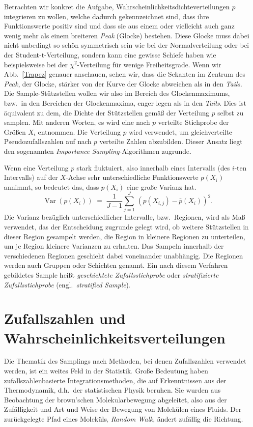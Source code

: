 Betrachten wir konkret die Aufgabe, Wahrscheinlichkeitsdichteverteilungen $p$
integrieren zu wollen, welche dadurch gekennzeichnet sind, dass ihre Funktionswerte
positiv sind und dass sie aus einem
oder vielleicht auch ganz wenig mehr als einem breiteren \textsl{Peak} (Glocke) bestehen.
Diese Glocke muss dabei nicht unbedingt so schön symmetrisch sein wie bei der 
Normalverteilung oder bei der Student-t-Verteilung, sondern kann eine gewisse Schiefe haben
wie beispielsweise bei der $\chi^2$-Verteilung für wenige Freiheitsgrade.
Wenn wir Abb.~\ref{Trapez} genauer anschauen, sehen wir, dass die Sekanten im Zentrum
des \textsl{Peak}, der Glocke, stärker von der Kurve der Glocke abweichen als in den
\textsl{Tails}. Die Sample-Stützstellen wollen wir also im Bereich des Glockenmaximums, bzw.\
in den Bereichen der Glockenmaxima, enger legen als in den \textsl{Tails}. Dies ist äquivalent
zu dem, die Dichte der Stützstellen gemäß der Verteilung $p$ selbst zu samplen.
Mit anderen Worten, es wird eine nach $p$ verteilte Stichprobe der Größen $X_i$
entnommen. Die Verteilung $p$ wird verwendet, um gleichverteilte Pseudozufallszahlen auf nach $p$
verteilte Zahlen abzubilden. 
Dieser Ansatz liegt den sogenannten \textsl{Importance Sampling}-Algorithmen zugrunde.

Wenn eine Verteilung $p$ stark fluktuiert, also innerhalb eines
Intervalls (des $i$-ten Intervalls) auf der $X$-Achse sehr unterschiedliche Funktionswerte $p(X_i)$ annimmt,
so bedeutet das, dass $p(X_i)$ eine große Varianz hat.
\begin{equation}
\operatorname{Var}(p(X_i)) \; = \; \frac{1}{J-1} \sum_{j=1}^J \, \left(p(X_{i,j})- \bar p(X_i)\right)^2 .
\end{equation}
Die Varianz bezüglich unterschiedlicher Intervalle, bzw.\ Regionen, wird als Maß verwendet,
das der Entscheidung zugrunde gelegt wird, ob weitere Stützstellen in dieser Region
gesampelt werden, die Region in kleinere Regionen zu unterteilen, um je Region kleinere Varianzen
zu erhalten.
Das Sampeln innerhalb der verschiedenen Regionen geschieht dabei
voneinander unabhängig. Die Regionen werden auch Gruppen oder Schichten genannt.
Ein nach diesem Verfahren gebildetes Sample heißt \textsl{geschichtete Zufallsstichprobe}
oder \textsl{stratifizierte Zufallsstichprobe} (engl.\ \textsl{stratified Sample}).

\section{Zufallszahlen und Wahrscheinlichkeitsverteilungen}
Die Thematik des Samplings nach Methoden, bei denen Zufallszahlen verwendet werden, ist ein
weites Feld in der Statistik. Große Bedeutung haben zufallszahlenbasierte Integrationsmethoden,
die auf Erkenntnissen aus der Thermodynamik, d.h.\ der statistischen Physik beruhen.
Sie wurden aus Beobachtung der brown'schen Molekularbewegung abgeleitet, also aus der
Zufälligkeit und Art und Weise der Bewegung von Molekülen eines Fluids.
Der zurückgelegte Pfad eines Moleküls, \textsl{Random Walk},
ändert zufällig die Richtung.

